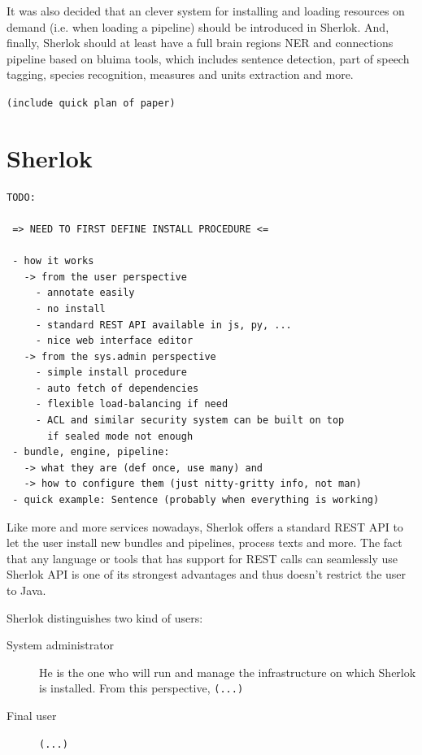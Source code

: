 \documentclass{article}
\newcommand{\TODO}[1]{\texttt{\textcolor{YellowOrange}{(#1)}}} %
\begin{document}
It was also decided that an clever system for installing and loading resources on demand (i.e.
when loading a pipeline) should be introduced in Sherlok. And, finally, Sherlok should at least have
a full brain regions NER and connections pipeline based on bluima tools, which includes sentence
detection, part of speech tagging, species recognition, measures and units extraction and more.

\TODO{include quick plan of paper}

\section{Sherlok}

\begin{verbatim}
TODO:

 => NEED TO FIRST DEFINE INSTALL PROCEDURE <=

 - how it works
   -> from the user perspective
     - annotate easily
     - no install
     - standard REST API available in js, py, ...
     - nice web interface editor
   -> from the sys.admin perspective
     - simple install procedure
     - auto fetch of dependencies
     - flexible load-balancing if need
     - ACL and similar security system can be built on top
       if sealed mode not enough
 - bundle, engine, pipeline:
   -> what they are (def once, use many) and
   -> how to configure them (just nitty-gritty info, not man)
 - quick example: Sentence (probably when everything is working)
\end{verbatim}

Like more and more services nowadays, Sherlok offers a standard REST API to let the user install new bundles and pipelines, process texts and more. The fact that any language or tools that has support for REST calls can seamlessly use Sherlok API is one of its strongest advantages and thus doesn't restrict the user to Java.

Sherlok distinguishes two kind of users:

\begin{description}

\item[System administrator] He is the one who will run and manage the infrastructure on which Sherlok is installed. From this perspective, \TODO{...}

\item[Final user] \TODO{...}

\end{description}
\end{document}
